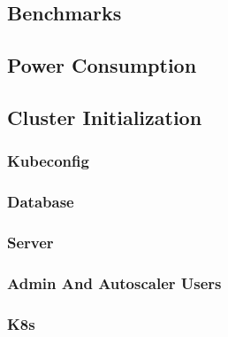 \subsection{Benchmarks}
\label{subsec:implementation_installer_node_benchmarks}


\subsection{Power Consumption}
\label{subsec:implementation_installer_node_power_consumption}


\subsection{Cluster Initialization}
\label{subsec:implementation_installer_cluster_initialization}

\subsubsection{Kubeconfig}
\label{subsubsec:implementation_installer_cluster_initialization_kubeconfig}


\subsubsection{Database}
\label{subsubsec:implementation_installer_cluster_initialization_database}

\subsubsection{Server}
\label{subsubsec:implementation_installer_cluster_initialization_server}

\subsubsection{Admin And Autoscaler Users}
\label{subsubsec:implementation_installer_cluster_initialization_admin_and_autoscaler_users}

\subsubsection{K8s}
\label{subsubsec:implementation_installer_cluster_initialization_k8s}